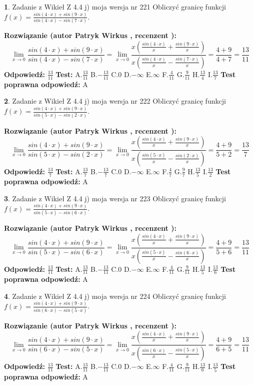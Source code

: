 \documentclass[12pt, a4paper]{article}
\theoremstyle{definition} %
\newtheorem{zad}{}
\newcommand{\zadStart}[1]{\begin{zad}#1\newline}
\newcommand{\zadStop}{\end{zad}}
\newcommand{\rozwStart}[2]{\noindent \textbf{Rozwiązanie (autor #1 , recenzent #2): }\newline}
\newcommand{\rozwStop}{\newline}
\newcommand{\odpStart}{\noindent \textbf{Odpowiedź:}\newline}
\newcommand{\odpStop}{\newline}
\newcommand{\testStart}{\noindent \textbf{Test:}\newline}
\newcommand{\testStop}{\newline}
\newcommand{\kluczStart}{\noindent \textbf{Test poprawna odpowiedź:}\newline}
\newcommand{\kluczStop}{\newline}
\begin{document}
\zadStart{Zadanie z Wikieł Z 4.4 j) moja wersja nr 221}
Obliczyć granicę funkcji $f(x)=\frac{sin(4\cdot x) +sin(9\cdot x)}{sin(4\cdot x) -sin(7\cdot x)}$.
\zadStop
\rozwStart{Patryk Wirkus}{}
$$\lim\limits_{x\to 0}\frac{sin(4\cdot x) +sin(9\cdot x)}{sin(4\cdot x) -sin(7\cdot x)}=\lim\limits_{x\to 0}\frac{x(\frac{sin(4\cdot x)}{x}+\frac{sin(9\cdot x)}{x})}{x(\frac{sin(4\cdot x)}{x}-\frac{sin(7\cdot x)}{x})}=\frac{4+9}{4+7} = \frac{13}{11}$$
\rozwStop
\odpStart
$\frac{13}{11}$
\odpStop
\testStart
A.$\frac{13}{11}$
B.$-\frac{13}{11}$
C.$0$
D.$-\infty$
E.$\infty$
F.$\frac{4}{11}$
G.$\frac{9}{11}$
H.$\frac{13}{4}$
I.$\frac{13}{7}$
\testStop
\kluczStart
A
\kluczStop



\zadStart{Zadanie z Wikieł Z 4.4 j) moja wersja nr 222}
Obliczyć granicę funkcji $f(x)=\frac{sin(4\cdot x) +sin(9\cdot x)}{sin(5\cdot x) -sin(2\cdot x)}$.
\zadStop
\rozwStart{Patryk Wirkus}{}
$$\lim\limits_{x\to 0}\frac{sin(4\cdot x) +sin(9\cdot x)}{sin(5\cdot x) -sin(2\cdot x)}=\lim\limits_{x\to 0}\frac{x(\frac{sin(4\cdot x)}{x}+\frac{sin(9\cdot x)}{x})}{x(\frac{sin(5\cdot x)}{x}-\frac{sin(2\cdot x)}{x})}=\frac{4+9}{5+2} = \frac{13}{7}$$
\rozwStop
\odpStart
$\frac{13}{7}$
\odpStop
\testStart
A.$\frac{13}{7}$
B.$-\frac{13}{7}$
C.$0$
D.$-\infty$
E.$\infty$
F.$\frac{4}{7}$
G.$\frac{9}{7}$
H.$\frac{13}{5}$
I.$\frac{13}{2}$
\testStop
\kluczStart
A
\kluczStop



\zadStart{Zadanie z Wikieł Z 4.4 j) moja wersja nr 223}
Obliczyć granicę funkcji $f(x)=\frac{sin(4\cdot x) +sin(9\cdot x)}{sin(5\cdot x) -sin(6\cdot x)}$.
\zadStop
\rozwStart{Patryk Wirkus}{}
$$\lim\limits_{x\to 0}\frac{sin(4\cdot x) +sin(9\cdot x)}{sin(5\cdot x) -sin(6\cdot x)}=\lim\limits_{x\to 0}\frac{x(\frac{sin(4\cdot x)}{x}+\frac{sin(9\cdot x)}{x})}{x(\frac{sin(5\cdot x)}{x}-\frac{sin(6\cdot x)}{x})}=\frac{4+9}{5+6} = \frac{13}{11}$$
\rozwStop
\odpStart
$\frac{13}{11}$
\odpStop
\testStart
A.$\frac{13}{11}$
B.$-\frac{13}{11}$
C.$0$
D.$-\infty$
E.$\infty$
F.$\frac{4}{11}$
G.$\frac{9}{11}$
H.$\frac{13}{5}$
I.$\frac{13}{6}$
\testStop
\kluczStart
A
\kluczStop



\zadStart{Zadanie z Wikieł Z 4.4 j) moja wersja nr 224}
Obliczyć granicę funkcji $f(x)=\frac{sin(4\cdot x) +sin(9\cdot x)}{sin(6\cdot x) -sin(5\cdot x)}$.
\zadStop
\rozwStart{Patryk Wirkus}{}
$$\lim\limits_{x\to 0}\frac{sin(4\cdot x) +sin(9\cdot x)}{sin(6\cdot x) -sin(5\cdot x)}=\lim\limits_{x\to 0}\frac{x(\frac{sin(4\cdot x)}{x}+\frac{sin(9\cdot x)}{x})}{x(\frac{sin(6\cdot x)}{x}-\frac{sin(5\cdot x)}{x})}=\frac{4+9}{6+5} = \frac{13}{11}$$
\rozwStop
\odpStart
$\frac{13}{11}$
\odpStop
\testStart
A.$\frac{13}{11}$
B.$-\frac{13}{11}$
C.$0$
D.$-\infty$
E.$\infty$
F.$\frac{4}{11}$
G.$\frac{9}{11}$
H.$\frac{13}{6}$
I.$\frac{13}{5}$
\testStop
\kluczStart
A
\kluczStop
\end{document}
